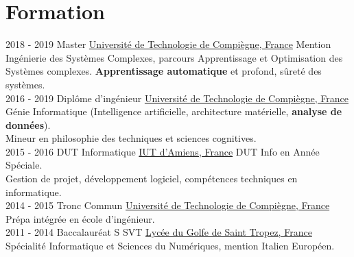 \documentclass[a4paper]{twentysecondcv} %
\begin{document}
\makeprofile %


\section{Formation}

\begin{twenty} %
	\twentyitem
    	{2018 - 2019}
        {}
        {Master}
        {\href{https://www.utc.fr/}{Université de Technologie de Compiègne, France}}
        {}
        {Mention Ingénierie des Systèmes Complexes, parcours Apprentissage et Optimisation des Systèmes complexes. \textbf{Apprentissage automatique} et profond, sûreté des systèmes.}
    \\
	\twentyitem
    	{2016 - 2019}
        {}
        {Diplôme d'ingénieur}
        {\href{https://www.utc.fr/}{Université de Technologie de Compiègne, France}}
        {}
        {Génie Informatique (Intelligence artificielle, architecture matérielle, \textbf{analyse de données}).\\Mineur en philosophie des techniques et sciences cognitives.}
    \\
	\twentyitem
    	{2015 - 2016}
        {}
        {DUT Informatique}
        {\href{http://www.iut-amiens.fr/}{IUT d'Amiens, France}}
        {}
        {DUT Info en Année Spéciale.\\Gestion de projet, développement logiciel, compétences techniques en informatique.}
    \\
	\twentyitem
    	{2014 - 2015}
        {}
        {Tronc Commun}
        {\href{https://www.utc.fr/}{Université de Technologie de Compiègne, France}}
        {}
        {Prépa intégrée en école d'ingénieur.}
    \\
	\twentyitem
    	{2011 - 2014}
		{}
        {Baccalauréat S SVT}
        {\href{http://www.lyc-du-golfe-de-saint-tropez.ac-nice.fr/}{Lycée du Golfe de Saint Tropez, France}}
        {}
        {Spécialité Informatique et Sciences du Numériques, mention Italien Européen.}
\end{twenty}

\end{document}
